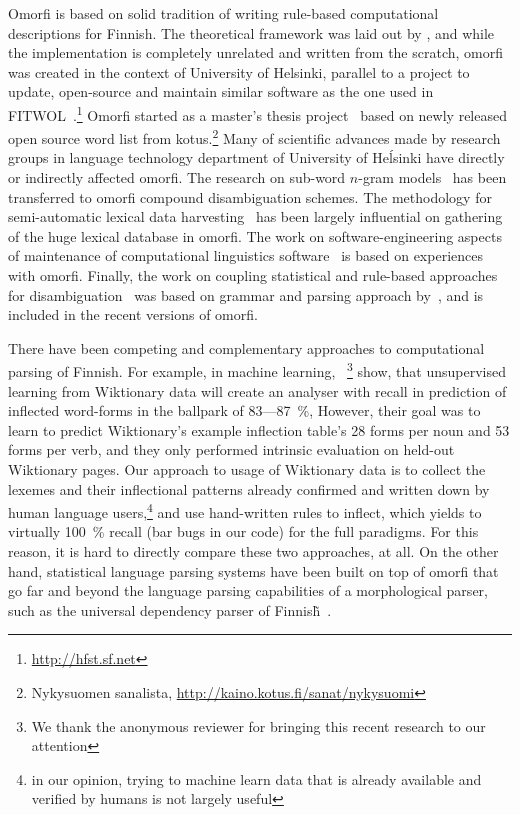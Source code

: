 \documentclass[a4paper,12pt]{article}
\begin{document}
Omorfi is based on solid tradition of writing rule-based computational
descriptions for Finnish. The theoretical framework was laid out by
\citet{koskenniemi1983twolevel}, and while the implementation is completely
unrelated and written from the scratch, omorfi was created in the context of
University of Helsinki, parallel to a project to update, open-source and
maintain similar software as the one used in
FITWOL~\citep{hfst2012}.\footnote{\url{http://hfst.sf.net}} Omorfi started  as
a master's thesis project~\citep{pirinen2008} based on newly released open
source word list from kotus.\footnote{Nykysuomen sanalista,
\url{http://kaino.kotus.fi/sanat/nykysuomi}} Many of scientific advances made
by research groups in language technology department of University of Heĺsinki
have directly or indirectly affected omorfi. The research on sub-word
\(n\)-gram models~\citep{pirinen,} has been transferred to omorfi compound
disambiguation schemes. The methodology for semi-automatic lexical data
harvesting~\citep{linden} has been largely influential on gathering of the huge
lexical database in omorfi. The work on software-engineering aspects of
maintenance of computational linguistics software~\cite{} is based on
experiences with omorfi. Finally, the work on coupling statistical and
rule-based approaches for disambiguation~\citep{} was based on grammar and
parsing approach by~\citet{}, and is included in the recent versions of omorfi.

There have been competing and complementary approaches to computational
parsing of Finnish. For example, in machine learning,
~\citet{durrett2013supervised}\footnote{We thank the anonymous reviewer for
bringing this recent research to our attention} show, that unsupervised
learning from Wiktionary data will create an analyser with recall in
prediction of inflected word-forms in the ballpark of 83---87~\%, However,
their goal was to learn to predict Wiktionary's example inflection table's
28 forms per noun and 53 forms per verb, and they only performed intrinsic
evaluation on held-out Wiktionary pages. Our approach to usage of Wiktionary
data is to collect the lexemes and their inflectional patterns already
confirmed and written down by human language users,\footnote{in our opinion,
trying to machine learn data that is already available and verified by
humans is not largely useful} and use hand-written rules to inflect, which
yields to virtually 100~\% recall (bar bugs in our code) for the full
paradigms. For this reason, it is hard to directly compare these two
approaches, at all. On the other hand, statistical language parsing systems
have been built on top of omorfi that go far and beyond the language parsing
capabilities of a morphological parser, such as the universal dependency
parser of Finnish̃~\cite{UDfinnishnodalida}.
\end{document}
